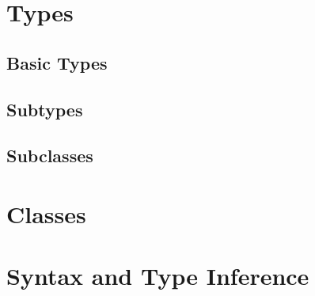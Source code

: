\chapter{Types}
\section{Basic Types}
\section{Subtypes}
\section{Subclasses}

\chapter{Classes}

\chapter{Syntax and Type Inference}
